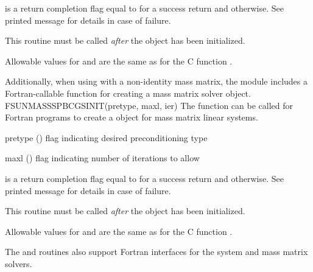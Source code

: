 {
   is a return completion flag equal to  for a success
  return and  otherwise. See printed message for details in case
  of failure.
}
{
  This routine must be called \emph{after} the {\nvector} object has
  been initialized.

  Allowable values for  and  are the same as for
  the C function .
}
Additionally, when using
{\arkode} with a non-identity mass matrix, the {\sunlinsolspbcgs} module
includes a Fortran-callable function for creating a
 mass matrix solver object.
{
  FSUNMASSSPBCGSINIT(pretype, maxl, ier)
}
{
  The function  can be called for Fortran programs
  to create a {\sunlinsolspbcgs} object for mass matrix linear systems.
}
{
  \begin{args}[pretype]
  \item[pretype] ()
    flag indicating desired preconditioning type
  \item[maxl] ()
    flag indicating number of iterations to allow
  \end{args}
}
{
   is a  return completion flag equal to  for a success
  return and  otherwise. See printed message for details in case
  of failure.
}
{
  This routine must be called \emph{after} the {\nvector} object has
  been initialized.

  Allowable values for  and  are the same as for
  the C function .
}
The  and
 routines also support Fortran interfaces
for the system and mass matrix solvers.

